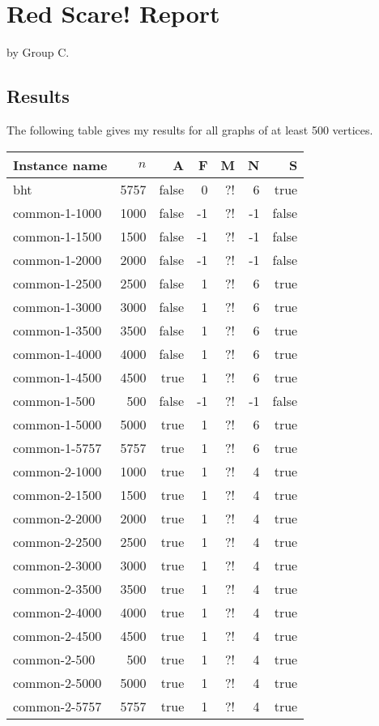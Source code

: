 \documentclass{tufte-handout}
\begin{document}
\section{Red Scare! Report}

by Group C.

\subsection{Results}

The following table gives my results for all graphs of at least 500 vertices.

\medskip
\begin{longtable}{lrrrrrr}
  \toprule
  Instance name & $n$ & A & F & M & N & S \\
  \midrule
bht&5757&false&0&?!&6&true\\ 
common-1-1000&1000&false&-1&?!&-1&false\\ 
common-1-1500&1500&false&-1&?!&-1&false\\ 
common-1-2000&2000&false&-1&?!&-1&false\\ 
common-1-2500&2500&false&1&?!&6&true\\ 
common-1-3000&3000&false&1&?!&6&true\\ 
common-1-3500&3500&false&1&?!&6&true\\
common-1-4000&4000&false&1&?!&6&true\\ 
common-1-4500&4500&true&1&?!&6&true\\ 
common-1-500&500&false&-1&?!&-1&false\\ 
common-1-5000&5000&true&1&?!&6&true\\ 
common-1-5757&5757&true&1&?!&6&true\\ 
common-2-1000&1000&true&1&?!&4&true\\ 
common-2-1500&1500&true&1&?!&4&true\\ 
common-2-2000&2000&true&1&?!&4&true\\ 
common-2-2500&2500&true&1&?!&4&true\\ 
common-2-3000&3000&true&1&?!&4&true\\ 
common-2-3500&3500&true&1&?!&4&true\\ 
common-2-4000&4000&true&1&?!&4&true\\ 
common-2-4500&4500&true&1&?!&4&true\\ 
common-2-500&500&true&1&?!&4&true\\ 
common-2-5000&5000&true&1&?!&4&true\\ 
common-2-5757&5757&true&1&?!&4&true\\ 

\end{longtable}
\end{document}
